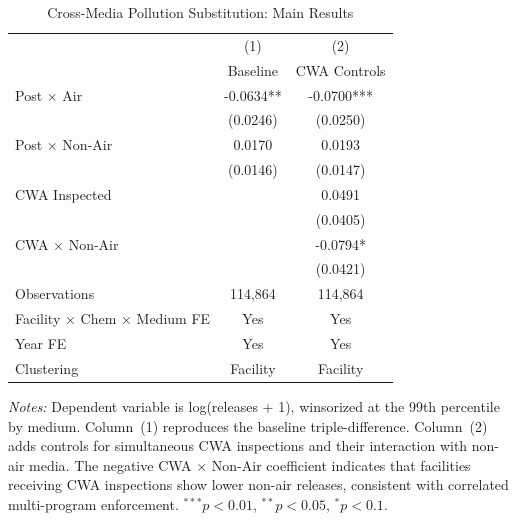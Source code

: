 \begin{table}[htbp]
\centering
\caption{Cross-Media Pollution Substitution: Main Results}
\label{tab:main}
\begin{tabular}{lcc}
\toprule
& (1) & (2) \\
& Baseline & CWA Controls \\
\midrule
Post $\times$ Air & -0.0634** & -0.0700*** \\
& (0.0246) & (0.0250) \\[6pt]
Post $\times$ Non-Air & 0.0170 & 0.0193 \\
& (0.0146) & (0.0147) \\[6pt]
CWA Inspected & & 0.0491 \\
& & (0.0405) \\[6pt]
CWA $\times$ Non-Air & & -0.0794* \\
& & (0.0421) \\[6pt]
\midrule
Observations & 114,864 & 114,864 \\
Facility $\times$ Chem $\times$ Medium FE & Yes & Yes \\
Year FE & Yes & Yes \\
Clustering & Facility & Facility \\
\bottomrule
\end{tabular}
\begin{minipage}{0.95\textwidth}
\vspace{0.3em}
\footnotesize \textit{Notes:} Dependent variable is log(releases + 1), winsorized at the 99th percentile by medium. Column~(1) reproduces the baseline triple-difference. Column~(2) adds controls for simultaneous CWA inspections and their interaction with non-air media. The negative CWA $\times$ Non-Air coefficient indicates that facilities receiving CWA inspections show lower non-air releases, consistent with correlated multi-program enforcement. $^{***}p<0.01$, $^{**}p<0.05$, $^{*}p<0.1$.
\end{minipage}
\end{table}
